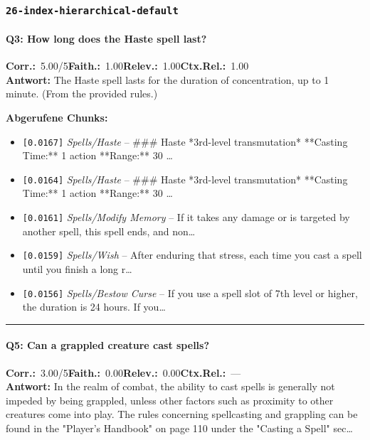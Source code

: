 \subsubsection*{\texttt{26-index-hierarchical-default}}
\label{app:samples:26_index_hierarchical_default}

\paragraph{Q3: How long does the Haste spell last?}
\noindent \textbf{Corr.:}~5.00/5\quad \textbf{Faith.:}~1.00\quad \textbf{Relev.:}~1.00\quad \textbf{Ctx.Rel.:}~1.00\\

\noindent\textbf{Antwort:} The Haste spell lasts for the duration of concentration, up to 1 minute. (From the provided rules.)

\noindent\textbf{Abgerufene Chunks:}
\begin{itemize}[noitemsep, topsep=2pt]
  \item[\textbf{\#1}] \texttt{[0.0167]} \textit{Spells/Haste} -- \#\#\# Haste  *3rd-level transmutation*  **Casting Time:** 1 action  **Range:** 30 \ldots
  \item[\textbf{\#2}] \texttt{[0.0164]} \textit{Spells/Haste} -- \#\#\# Haste  *3rd-level transmutation*  **Casting Time:** 1 action  **Range:** 30 \ldots
  \item[\textbf{\#3}] \texttt{[0.0161]} \textit{Spells/Modify Memory} -- If it takes any damage or is targeted by another spell, this spell ends, and non\ldots
  \item[\textbf{\#4}] \texttt{[0.0159]} \textit{Spells/Wish} -- After enduring that stress, each time you cast a spell until you finish a long r\ldots
  \item[\textbf{\#5}] \texttt{[0.0156]} \textit{Spells/Bestow Curse} -- If you use a spell slot of 7th level or higher, the duration is 24 hours. If you\ldots
\end{itemize}
\vspace{4pt}
\hrule
\vspace{6pt}

\paragraph{Q5: Can a grappled creature cast spells?}
\noindent \textbf{Corr.:}~3.00/5\quad \textbf{Faith.:}~0.00\quad \textbf{Relev.:}~0.00\quad \textbf{Ctx.Rel.:}~—\\

\noindent\textbf{Antwort:} In the realm of combat, the ability to cast spells is generally not impeded by being grappled, unless other factors such as proximity to other creatures come into play. The rules concerning spellcasting and grappling can be found in the "Player's Handbook" on page 110 under the "Casting a Spell" sec\ldots

